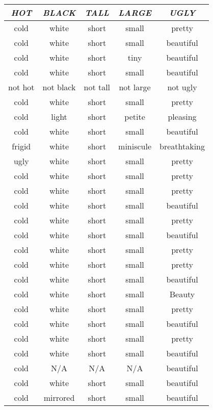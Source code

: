 \begin{table}
	\begin{center}
		\begin{tabular}{|c|c|c|c|c|} \hline
			\textit{HOT} & \textit{BLACK} & \textit{TALL} & \textit{LARGE} & \textit{UGLY} \\ \hline \hline
			cold	&	white	&	short	&	small	&	pretty		\\
			cold	&	white	&	short	&	small	&	beautiful		\\
			cold	&	white	&	short	&	tiny	&	beautiful		\\
			cold	&	white	&	short	&	small	&	beautiful		\\
			not hot	&	not black	&	not tall	&	not large	&	not ugly		\\
			cold	&	white	&	short	&	small	&	pretty		\\
			cold	&	light	&	short	&	petite	&	pleasing		\\
			cold	&	white	&	short	&	small	&	beautiful		\\
			frigid	&	white	&	short	&	miniscule	&	breathtaking		\\
			ugly	&	white	&	short	&	small	&	pretty		\\
			cold	&	white	&	short	&	small	&	pretty		\\
			cold	&	white	&	short	&	small	&	pretty		\\
			cold	&	white	&	short	&	small	&	beautiful		\\
			cold	&	white	&	short	&	small	&	pretty		\\
			cold	&	white	&	short	&	small	&	beautiful		\\
			cold	&	white	&	short	&	small	&	pretty		\\
			cold	&	white	&	short	&	small	&	pretty		\\
			cold	&	white	&	short	&	small	&	beautiful		\\
			cold	&	white	&	short	&	small	&	Beauty 		\\
			cold	&	white	&	short	&	small	&	pretty		\\
			cold	&	white	&	short	&	small	&	beautiful		\\
			cold	&	white	&	short	&	small	&	pretty		\\
			cold	&	white	&	short	&	small	&	beautiful		\\
			cold	&	N/A	&	N/A	&	N/A	&	beautiful		\\
			cold	&	white	&	short	&	small	&	beautiful		\\
			cold	&	mirrored	&	short	&	small	&	beautiful		\\

\end{tabular}
\end{center}
\end{table}
